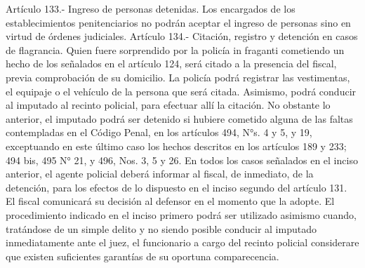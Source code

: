     Artículo 133.- Ingreso de personas detenidas. Los encargados de los establecimientos penitenciarios no podrán aceptar el ingreso de personas sino en virtud de órdenes judiciales.
    Artículo 134.- Citación, registro y detención en casos de flagrancia. Quien fuere sorprendido por la policía in fraganti cometiendo un hecho de los señalados en el artículo 124, será citado a la presencia del fiscal, previa comprobación de su domicilio.
    La policía podrá registrar las vestimentas, el equipaje o el vehículo de la persona que será citada.
    Asimismo, podrá conducir al imputado al recinto policial, para efectuar allí la citación.
    No obstante lo anterior, el imputado podrá ser detenido si hubiere cometido alguna de las faltas contempladas en el Código Penal, en los artículos 494, N°s. 4 y 5, y 19, exceptuando en este último caso los hechos descritos en los artículos 189 y 233; 494 bis, 495 N° 21, y 496, Nos. 3, 5 y 26.
    En todos los casos señalados en el inciso anterior, el agente policial deberá informar al fiscal, de inmediato, de la detención, para los  efectos de lo dispuesto en el inciso segundo del artículo 131. El fiscal comunicará su decisión al defensor en el momento que la adopte.
    El procedimiento indicado en el inciso primero podrá ser utilizado asimismo cuando, tratándose de un simple delito y no siendo posible conducir al imputado inmediatamente ante el juez, el funcionario a cargo del recinto policial considerare que existen suficientes garantías de su oportuna comparecencia.




